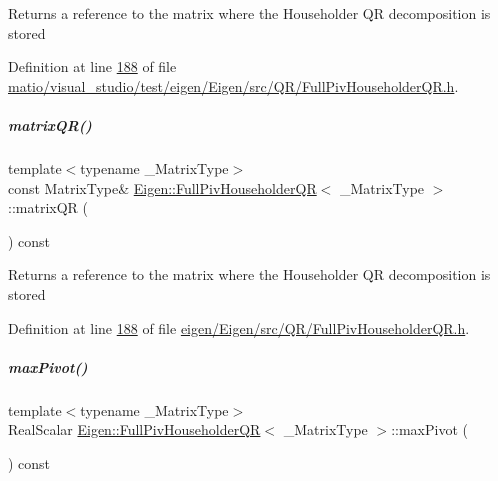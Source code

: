 \begin{DoxyReturn}{Returns}
a reference to the matrix where the Householder QR decomposition is stored 
\end{DoxyReturn}


Definition at line \hyperlink{matio_2visual__studio_2test_2eigen_2_eigen_2src_2_q_r_2_full_piv_householder_q_r_8h_source_l00188}{188} of file \hyperlink{matio_2visual__studio_2test_2eigen_2_eigen_2src_2_q_r_2_full_piv_householder_q_r_8h_source}{matio/visual\+\_\+studio/test/eigen/\+Eigen/src/\+Q\+R/\+Full\+Piv\+Householder\+Q\+R.\+h}.

\mbox{\label{group___q_r___module_a9c16411e5d8f1fc634a5797018d5aa3e}} 
\subparagraph{\texorpdfstring{matrix\+Q\+R()}{matrixQR()}\hspace{0.1cm}{\footnotesize\ttfamily [2/2]}}
{\footnotesize\ttfamily template$<$typename \+\_\+\+Matrix\+Type$>$ \\
const Matrix\+Type\& \hyperlink{group___q_r___module_class_eigen_1_1_full_piv_householder_q_r}{Eigen\+::\+Full\+Piv\+Householder\+QR}$<$ \+\_\+\+Matrix\+Type $>$\+::matrix\+QR (\begin{DoxyParamCaption}{ }\end{DoxyParamCaption}) const\hspace{0.3cm}{\ttfamily [inline]}}

\begin{DoxyReturn}{Returns}
a reference to the matrix where the Householder QR decomposition is stored 
\end{DoxyReturn}


Definition at line \hyperlink{eigen_2_eigen_2src_2_q_r_2_full_piv_householder_q_r_8h_source_l00188}{188} of file \hyperlink{eigen_2_eigen_2src_2_q_r_2_full_piv_householder_q_r_8h_source}{eigen/\+Eigen/src/\+Q\+R/\+Full\+Piv\+Householder\+Q\+R.\+h}.

\mbox{\label{group___q_r___module_a7887506237a3bf912aebc9aaa8edacec}} 
\subparagraph{\texorpdfstring{max\+Pivot()}{maxPivot()}\hspace{0.1cm}{\footnotesize\ttfamily [1/2]}}
{\footnotesize\ttfamily template$<$typename \+\_\+\+Matrix\+Type$>$ \\
Real\+Scalar \hyperlink{group___q_r___module_class_eigen_1_1_full_piv_householder_q_r}{Eigen\+::\+Full\+Piv\+Householder\+QR}$<$ \+\_\+\+Matrix\+Type $>$\+::max\+Pivot (\begin{DoxyParamCaption}{ }\end{DoxyParamCaption}) const\hspace{0.3cm}{\ttfamily [inline]}}

